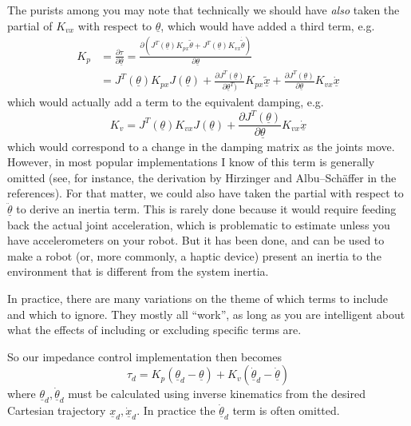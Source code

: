 \documentclass[]{article}
\begin{document}
The purists among you may note that technically we should have \textit{also} taken the partial of $K_{vx}$ with respect to $\underline{\theta}$, which would have added a third term, e.g.
\begin{equation}
 \begin{split}
    K_{p} & = \frac{\partial \tau}{\partial\underline{\theta}} = \frac{\partial ( J^{T}(\underline{\theta})K_{px}\tilde{\theta} + J^{T}(\underline{\theta})K_{vx}\dot{\tilde{\theta}})}{\partial\underline{\theta}}\\ & = J^{T}(\underline{\theta})K_{px}J(\underline{\theta}) + \frac{\partial J^{T}(\underline{\theta})}{\partial \underline{\theta}^{T})}K_{px}\tilde{\underline{x}} + \frac{\partial J^{T}(\underline{\theta})}{\partial\underline{\theta}}K_{vx}\dot{\underline{x}}
 \end{split}
\end{equation}
which would actually add a term to the equivalent damping, e.g.
\begin{equation}
 K_{v} = J^{T}(\underline{\theta})K_{vx}J(\underline{\theta}) + \frac{\partial J^{T}(\underline{\theta})}{\partial\underline{\theta}}K_{vx}\dot{\underline{x}}
\end{equation}
which would correspond to a change in the damping matrix as the joints move. However, in most popular implementations I know of this term is generally omitted (see, for instance, the derivation by Hirzinger and Albu--Sch\"affer in the references). For that matter, we could also have taken the partial with respect to $\underline{\ddot{\theta}}$ to derive an inertia term. This is rarely done because it would require feeding back the actual joint acceleration, which is problematic to estimate unless you have accelerometers on your robot. But it has been done, and can be used to make a robot (or, more commonly, a haptic device) present an inertia to the environment that is different from the  system inertia.

In practice, there are many variations on the theme of which terms to include and which to ignore. They mostly all ``work'', as long as you are intelligent about what the effects of including or excluding specific terms are.

So our impedance control implementation then becomes
\begin{equation}
 \tau_{d} = K_{p}(\underline{\theta}_{d} - \underline{\theta}) + K_{v}(\dot{\underline{\theta}}_{d} - \dot{\underline{\theta}}) \label{impedancecontrol}
\end{equation}
where $\underline{\theta}_{d}, \dot{\underline{\theta}}_{d}$ must be calculated using inverse kinematics from the desired Cartesian trajectory $\underline{x}_{d}, \dot{\underline{x}}_{d}$. In practice the $\dot{\underline{\theta}}_{d}$ term is often omitted.
\end{document}

